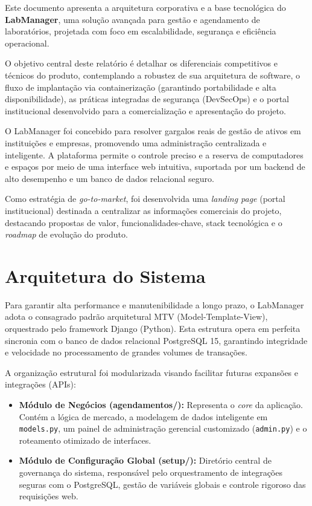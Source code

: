 \documentclass[12pt,a4paper]{article}
\begin{document}
	Este documento apresenta a arquitetura corporativa e a base tecnológica do \textbf{LabManager}, uma solução avançada para gestão e agendamento de laboratórios, projetada com foco em escalabilidade, segurança e eficiência operacional. 
	
	O objetivo central deste relatório é detalhar os diferenciais competitivos e técnicos do produto, contemplando a robustez de sua arquitetura de software, o fluxo de implantação via containerização (garantindo portabilidade e alta disponibilidade), as práticas integradas de segurança (DevSecOps) e o portal institucional desenvolvido para a comercialização e apresentação do projeto.
	
	O LabManager foi concebido para resolver gargalos reais de gestão de ativos em instituições e empresas, promovendo uma administração centralizada e inteligente. A plataforma permite o controle preciso e a reserva de computadores e espaços por meio de uma interface web intuitiva, suportada por um backend de alto desempenho e um banco de dados relacional seguro.
	
	Como estratégia de \textit{go-to-market}, foi desenvolvida uma \textit{landing page} (portal institucional) destinada a centralizar as informações comerciais do projeto, destacando propostas de valor, funcionalidades-chave, stack tecnológica e o \textit{roadmap} de evolução do produto.
	
	
	\section{Arquitetura do Sistema}
	
	Para garantir alta performance e manutenibilidade a longo prazo, o LabManager adota o consagrado padrão arquitetural MTV (Model-Template-View), orquestrado pelo framework Django (Python). Esta estrutura opera em perfeita sincronia com o banco de dados relacional PostgreSQL 15, garantindo integridade e velocidade no processamento de grandes volumes de transações.
	
	A organização estrutural foi modularizada visando facilitar futuras expansões e integrações (APIs):
	
	\begin{itemize}
		
		\item \textbf{Módulo de Negócios (agendamentos/):} Representa o \textit{core} da aplicação. Contém a lógica de mercado, a modelagem de dados inteligente em \texttt{models.py}, um painel de administração gerencial customizado (\texttt{admin.py}) e o roteamento otimizado de interfaces.
		
		\item \textbf{Módulo de Configuração Global (setup/):} Diretório central de governança do sistema, responsável pelo orquestramento de integrações seguras com o PostgreSQL, gestão de variáveis globais e controle rigoroso das requisições web.
		
	\end{itemize}
	
\end{document}
